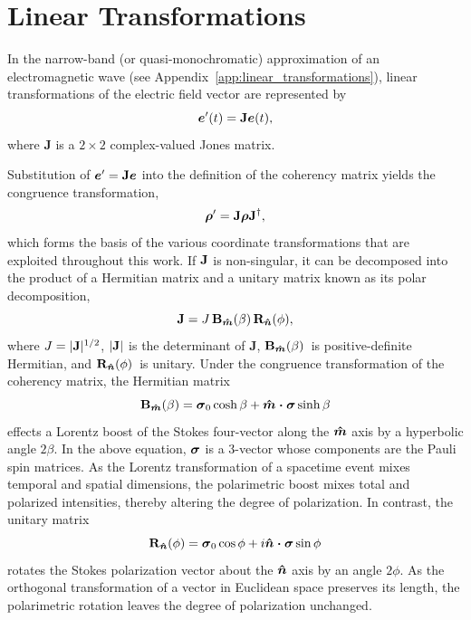 \documentclass[twocolumn]{aastex6}
\newcommand{\mbf}[1]{\mbox{\boldmath $#1$}}
\newcommand{\mbfs}[1]{\mbox{\scriptsize\boldmath $#1$}}
\newcommand{\App}[1]{Appendix~\ref{app:#1}}
\newcommand{\Ci}{\ensuremath{i}}
\newcommand{\Rotation}{{\bf R}}
\newcommand{\Boost}{{\bf B}}
\newcommand{\vRotation}[1][n]{\ensuremath{\Rotation_{\mbfs{\hat #1}}}}
\newcommand{\vBoost}[1][m]{\ensuremath{\Boost_{\mbfs{\hat #1}}}}
\newcommand{\rotat}{\ensuremath{\vRotation(\phi)}}
\newcommand{\boost}{\ensuremath{\vBoost(\beta)}}
\newcommand{\pauli}[1]{\ensuremath{\mbf{\sigma}_{#1}}}
\begin{document}
%



\section{Linear Transformations}
\label{sec:transformations}

In the narrow-band (or quasi-monochromatic) approximation of an
electromagnetic wave (see \App{linear_transformations}), linear
transformations of the electric field vector are represented by
%
\begin{equation}
\mbf{e}^\prime(t)={\bf J}\mbf{e}(t),
\label{eqn:field_transformation}
\end{equation}
where {\bf J} is a $2\times2$ complex-valued Jones matrix.

Substitution of
$\mbf{e}^\prime={\bf J}\mbf{e}$ into the definition of the coherency
matrix yields the congruence transformation,
%
\begin{equation}
{\mbf{\rho}^\prime}={\bf{J}}\mbf{\rho}{\bf{J}}^\dagger,
\label{eqn:congruence}
\end{equation}
which forms the basis of the various coordinate transformations that
are exploited throughout this work.
%
If ${\bf{J}}$ is non-singular, it can be decomposed into the product
of a Hermitian matrix and a unitary matrix known as its polar
decomposition,
\begin{equation}
\label{eqn:polar}
{\bf J} = J \, \boost \, \rotat,
\end{equation}
where $J=|{\bf J}|^{1/2}$, $|{\bf J}|$ is the determinant of {\bf J},
\boost\ is positive-definite Hermitian,
and \rotat\ is unitary.
%
Under the congruence transformation of the coherency matrix, the
Hermitian matrix
\begin{equation}
\label{eqn:Boost}
\boost = \pauli{0}\cosh\beta + \mbf{\hat{m}\cdot\sigma}\sinh\beta
\end{equation}
effects a Lorentz boost of the Stokes four-vector along the $\mbf{\hat
  m}$ axis by a hyperbolic angle $2\beta$.  In the above equation,
$\mbf{\sigma}$ is a 3-vector whose components are the Pauli spin
matrices.
As the Lorentz transformation of a spacetime event mixes temporal and
spatial dimensions, the polarimetric boost mixes total and polarized
intensities, thereby altering the degree of polarization.
%
In contrast, the unitary matrix
\begin{equation}
\label{eqn:Rotation}
\rotat = \pauli{0}\cos\phi + \Ci\mbf{\hat{n}\cdot\sigma}\sin\phi
\end{equation}
rotates the Stokes polarization vector about the $\mbf{\hat n}$ axis by
an angle $2\phi$.
As the orthogonal transformation of a vector in Euclidean space
preserves its length, the polarimetric rotation leaves the degree of
polarization unchanged.
%
\end{document}
